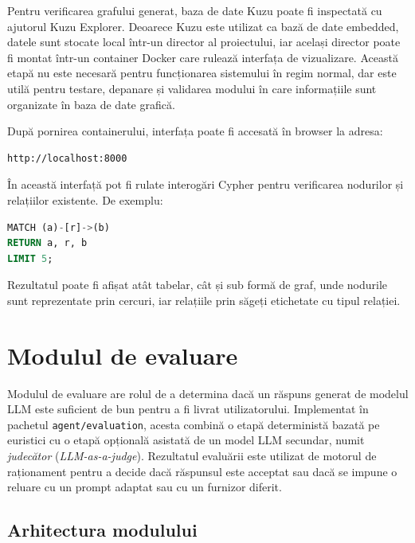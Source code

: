 \documentclass[12pt, a4paper, oneside, romanian]{teza-upb}
\begin{document}
Pentru verificarea grafului generat, baza de date Kuzu poate fi inspectată cu ajutorul Kuzu Explorer. Deoarece Kuzu este utilizat ca bază de date embedded, datele sunt stocate local într-un director al proiectului, iar același director poate fi montat într-un container Docker care rulează interfața de vizualizare. Această etapă nu este necesară pentru funcționarea sistemului în regim normal, dar este utilă pentru testare, depanare și validarea modului în care informațiile sunt organizate în baza de date grafică.

După pornirea containerului, interfața poate fi accesată în browser la adresa:

\begin{lstlisting}
http://localhost:8000
\end{lstlisting}

În această interfață pot fi rulate interogări Cypher pentru verificarea nodurilor și relațiilor existente. De exemplu:

\begin{center}
\begin{minipage}{0.42\textwidth}
\begin{lstlisting}[language=SQL, frame=single, framesep=4pt]
MATCH (a)-[r]->(b)
RETURN a, r, b
LIMIT 5;
\end{lstlisting}
\end{minipage}
\end{center}

Rezultatul poate fi afișat atât tabelar, cât și sub formă de graf, unde nodurile sunt reprezentate prin cercuri, iar relațiile prin săgeți etichetate cu tipul relației.


\section{Modulul de evaluare}
\label{sec:evaluare}

Modulul de evaluare are rolul de a determina dacă un răspuns generat de modelul LLM este suficient de bun pentru a fi livrat utilizatorului. Implementat în pachetul \texttt{agent/evaluation}, acesta combină o etapă deterministă bazată pe euristici cu o etapă opțională asistată de un model LLM secundar, numit \textit{judecător} (\textit{LLM-as-a-judge}). Rezultatul evaluării este utilizat de motorul de raționament pentru a decide dacă răspunsul este acceptat sau dacă se impune o reluare cu un prompt adaptat sau cu un furnizor diferit.

\subsection{Arhitectura modulului}
\end{document}
